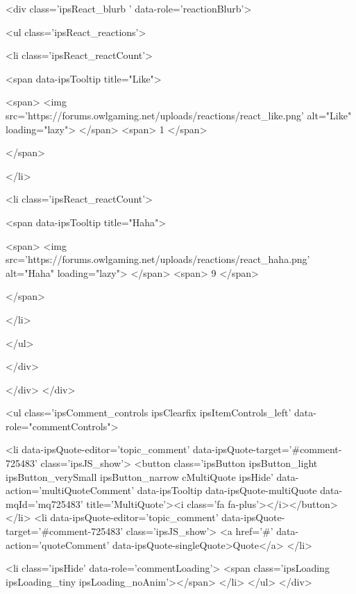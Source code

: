 				
				<div class='ipsReact_blurb ' data-role='reactionBlurb'>
					
						

	
	<ul class='ipsReact_reactions'>
		
		
			
				
				<li class='ipsReact_reactCount'>
					
						<span data-ipsTooltip title="Like">
					
							<span>
								<img src='https://forums.owlgaming.net/uploads/reactions/react_like.png' alt="Like" loading="lazy">
							</span>
							<span>
								1
							</span>
					
						</span>
					
				</li>
			
		
			
				
				<li class='ipsReact_reactCount'>
					
						<span data-ipsTooltip title="Haha">
					
							<span>
								<img src='https://forums.owlgaming.net/uploads/reactions/react_haha.png' alt="Haha" loading="lazy">
							</span>
							<span>
								9
							</span>
					
						</span>
					
				</li>
			
		
	</ul>

					
				</div>
			
			
			
		</div>
	</div>

					
				
				<ul class='ipsComment_controls ipsClearfix ipsItemControls_left' data-role="commentControls">
					
						
							<li data-ipsQuote-editor='topic_comment' data-ipsQuote-target='#comment-725483' class='ipsJS_show'>
								<button class='ipsButton ipsButton_light ipsButton_verySmall ipsButton_narrow cMultiQuote ipsHide' data-action='multiQuoteComment' data-ipsTooltip data-ipsQuote-multiQuote data-mqId='mq725483' title='MultiQuote'><i class='fa fa-plus'></i></button>
							</li>
							<li data-ipsQuote-editor='topic_comment' data-ipsQuote-target='#comment-725483' class='ipsJS_show'>
								<a href='#' data-action='quoteComment' data-ipsQuote-singleQuote>Quote</a>
							</li>
						
						
						
					
					<li class='ipsHide' data-role='commentLoading'>
						<span class='ipsLoading ipsLoading_tiny ipsLoading_noAnim'></span>
					</li>
				</ul>
			</div>
		

